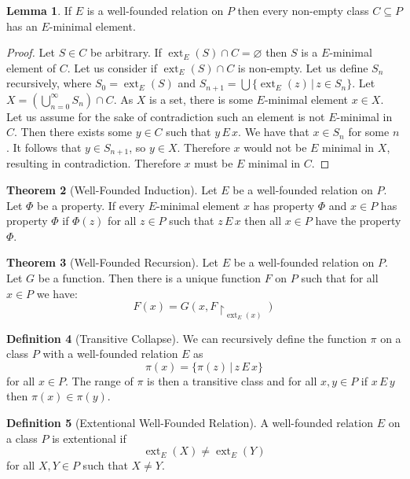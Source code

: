 \documentclass{article}
\theoremstyle{definition}
\newtheorem{thm}{Theorem}[section]
\newtheorem{defn}[thm]{Definition}
\newtheorem{lmma}[thm]{Lemma}
\newcommand*{\mtset}{\ensuremath{\varnothing}}
\DeclareMathOperator{\ext}{ext}
\begin{document}
\begin{lmma}
    If $E$ is a well-founded relation on $P$ then every non-empty class $C \subseteq P$ has an $E$-minimal element.
\end{lmma}

\begin{proof}
    Let $S \in C$ be arbitrary. If $\ext_E(S) \cap C = \mtset$ then $S$ is a $E$-minimal element of $C$. Let us consider if $\ext_E(S) \cap C$ is non-empty. Let us define $S_n$ recursively, where $S_0 = \ext_E(S)$ and $S_{n + 1} = \bigcup \{ \ext_E(z) \, | \, z \in S_n \}$. Let $X = (\bigcup_{n = 0}^\infty S_n) \cap C$. As $X$ is a set, there is some $E$-minimal element $x \in X$. Let us assume for the sake of contradiction such an element is not $E$-minimal in $C$. Then there exists some $y \in C$ such that $y \, E \, x$. We have that $x \in S_n$ for some $n$. It follows that $y \in S_{n + 1}$, so $y \in X$. Therefore $x$ would not be $E$ minimal in $X$, resulting in contradiction. Therefore $x$ must be $E$ minimal in $C$.
\end{proof}

\begin{thm}[Well-Founded Induction]
    Let $E$ be a well-founded relation on $P$. Let $\Phi$ be a property. If every $E$-minimal element $x$ has property $\Phi$ and $x \in P$ has property $\Phi$ if $\Phi(z)$ for all $z \in P$ such that $z \, E \, x$ then all $x \in P$ have the property $\Phi$.
\end{thm}

\begin{thm}[Well-Founded Recursion]
    Let $E$ be a well-founded relation on $P$. Let $G$ be a function. Then there is a unique function $F$ on $P$ such that for all $x \in P$ we have:
    \[
        F(x) = G(x, F \restriction_{\ext_E(x)})
    \]
\end{thm}

\begin{defn}[Transitive Collapse]
    We can recursively define the function $\pi$ on a class $P$ with a well-founded relation $E$ as 
    \[
        \pi(x) = \{ \pi(z) \, | \, z \, E \, x \}        
    \] 
    for all $x \in P$. The range of $\pi$ is then a transitive class and for all $x, y \in P$ if $x \, E \, y$ then $\pi(x) \in \pi(y)$.
\end{defn}

\begin{defn}[Extentional Well-Founded Relation]
    A well-founded relation $E$ on a class $P$ is extentional if 
    \[
        \ext_E(X) \ne \ext_E(Y)
    \]
    for all $X, Y \in P$ such that $X \ne Y$.
\end{defn}
\end{document}
